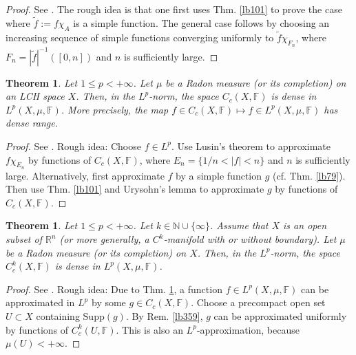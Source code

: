 \documentclass[12pt,b5paper,notitlepage]{article}
\theoremstyle{definition}
\theoremstyle{plain}
\newtheorem{thm}[df]{Theorem}
\newcommand{\wtd}{\widetilde}
\newcommand{\Nbb}{\mathbb N}
\newcommand{\Rbb}{\mathbb R}
\newcommand{\Supp}{\mathrm{Supp}}
\newcommand{\Fbb}{\mathbb F}
\numberwithin{equation}{section}
\begin{document}
\begin{proof}
See \cite[Sec. 25.4]{Gui-A}. The rough idea is that one first uses Thm. \ref{lb101} to prove the case where $\wtd f:=f\chi_A$ is a simple function. The general case follows by choosing an increasing sequence of simple functions converging uniformly to $\wtd f\chi_{F_n}$, where $F_n=|\wtd f|^{-1}([0,n])$ and $n$ is sufficiently large.
\end{proof}


\begin{thm}\label{lb14}
Let $1\leq p<+\infty$. Let $\mu$ be a Radon measure (or its completion) on an LCH space $X$. Then, in the $L^p$-norm, the space $C_c(X,\Fbb)$ is dense in $L^p(X,\mu,\Fbb)$. More precisely, the map $f\in C_c(X,\Fbb)\mapsto f\in L^p(X,\mu,\Fbb)$ has dense range.
\end{thm}


\begin{proof}
See \cite[Sec. 27.2]{Gui-A}. Rough idea: Choose $f\in L^p$. Use Lusin's theorem to approximate $f\chi_{E_n}$ by functions of $C_c(X,\Fbb)$, where $E_n=\{1/n<|f|<n\}$ and $n$ is sufficiently large. Alternatively, first approximate $f$ by a simple function $g$ (cf. Thm. \ref{lb79}). Then use Thm. \ref{lb101} and Urysohn's lemma to approximate $g$ by functions of $C_c(X,\Fbb)$.
\end{proof}


\begin{thm}\label{lb361}
Let $1\leq p<+\infty$. Let $k\in\Nbb\cup\{\infty\}$. Assume that $X$ is an open subset of $\Rbb^n$ (or more generally, a $C^k$-manifold with or without boundary). Let $\mu$ be a Radon measure (or its completion) on $X$. Then, in the $L^p$-norm, the space $C_c^k(X,\Fbb)$ is dense in $L^p(X,\mu,\Fbb)$.
\end{thm}


\begin{proof}
See \cite[Sec. 30.7]{Gui-A}. Rough idea: Due to Thm. \ref{lb14}, a function $f\in L^p(X,\mu,\Fbb)$ can be approximated in $L^p$ by some $g\in C_c(X,\Fbb)$. Choose a precompact open set $U\subset X$ containing $\Supp(g)$. By Rem. \ref{lb359}, $g$ can be approximated uniformly by functions of $C_c^k(U,\Fbb)$. This is also an $L^p$-approximation, because $\mu(U)<+\infty$.
\end{proof}
\end{document}
